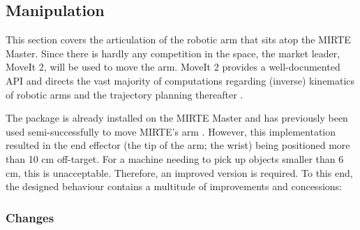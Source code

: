 \subsection{Manipulation}

This section covers the articulation of the robotic arm that sits atop the MIRTE Master. Since there is hardly any competition in the space, the market leader, MoveIt 2, will be used to move the arm. MoveIt 2 provides a well-documented API and directs the vast majority of computations regarding (inverse) kinematics of robotic arms and the trajectory planning thereafter \citep{moveit2_api}.

The package is already installed on the MIRTE Master and has previously been used semi-successfully to move MIRTE's arm \citep{mirte_moveit_tutorial}. However, this implementation resulted in the end effector (the tip of the arm; the wrist) being positioned more than 10 cm off-target. For a machine needing to pick up objects smaller than 6 cm, this is unacceptable. Therefore, an improved version is required. To this end, the designed behaviour contains a multitude of improvements and concessions:

\subsubsection{Changes}

